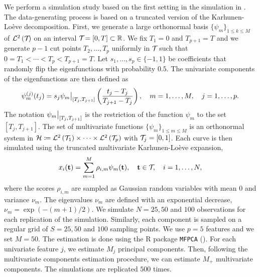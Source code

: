 We perform a simulation study based on the first setting in the simulation in \cite{happMultivariateFunctionalPrincipal2018}. The data-generating process is based on a truncated version of the Karhunen-Loève decomposition. First, we generate a large orthonormal basis $\{\psi_m\}_{1 \leq k \leq M}$ of $\mathcal{L}^{2}\left(\mathcal{T}_{}\right)$ on an interval $\mathcal{T}_{} = [0, T] \subset \mathbb{R}$. We fix $T_1 = 0$ and $T_{p + 1} = T$ and we generate $p - 1$ cut points $T_2, \dots, T_p$ uniformly in $\mathcal{T}_{}$ such that $0 = T_1 < \cdots < T_p < T_{p+1} = T$. Let $s_1, \dots, s_p \in \{-1, 1\}$ be coefficients that randomly flip the eigenfunctions with probability $0.5$. The univariate components of the eigenfunctions are then defined as
\begin{equation}\label{eq:simulation_uni_component}
    \psi_m^{(j)}(t_j) = s_j \restr{\psi_m}{[T_j, T_{j + 1}]}\left(\frac{t_j - T_j}{T_{j + 1} - T_j}\right), \quad m = 1, \dots, M, \quad j = 1, \dots, p.
\end{equation}
The notation $\restr{\psi_m}{[T_j, T_{j + 1}]}$ is the restriction of the function $\psi_m$ to the set $[T_j, T_{j + 1}]$. The set of multivariate functions $\{\psi_m\}_{1 \leq m \leq M}$ is an orthonormal system in $\mathcal{H} \coloneqq \mathcal{L}^{2}\left(\mathcal{T}_{1}\right) \times \dots \times \mathcal{L}^{2}\left(\mathcal{T}_{p}\right)$ with $\mathcal{T}_{j} = [0, 1]$. Each curve is then simulated using the truncated multivariate Karhunen-Loève expansion,
\begin{equation}
    x_i(\mathbf{t}) = \sum_{m = 1}^M \rho_{i, m} \psi_m(\mathbf{t}), \quad \mathbf{t} \in \mathcal{T}_{},\quad i = 1, \dots, N,
\end{equation}
where the scores $\rho_{i, m}$ are sampled as Gaussian random variables with mean $0$ and variance $\nu_m$. The eigenvalues $\nu_m$ are defined with an exponential decrease, $\nu_m = \exp(-(m + 1)/2)$. We simulate $N = 25, 50$ and $100$ observations for each replication of the simulation. Similarly, each component is sampled on a regular grid of $S = 25, 50$ and $100$ sampling points. We use $p = 5$ features and we set $M = 50$. The estimation is done using the \textsf{R} package \texttt{MFPCA} (\cite{happ-kurzObjectOrientedSoftwareFunctional2020}). For each univariate feature $j$, we estimate $M_j$ principal components. Then, following the multivariate components estimation procedure, we can estimate $M_+$ multivariate components. The simulations are replicated $500$ times.


